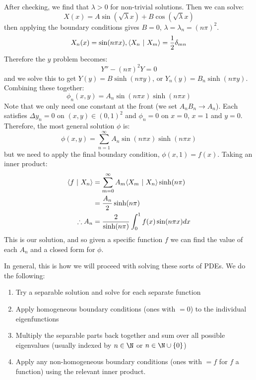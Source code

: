 \documentclass[../Main.tex]{subfiles}
\begin{document}
After checking, we find that $\lambda > 0$ for non-trivial solutions. Then we can solve:
\begin{equation*}
    X(x) = A\sin(\sqrt{\lambda}x) + B\cos(\sqrt{\lambda}x)
\end{equation*}
then applying the boundary conditions gives $B = 0$, $\lambda = \lambda_n = (n\pi)^2$.
\begin{equation*}
    X_n(x) = \sin(n\pi x), \langle X_n~\vert~X_m\rangle = \frac12 \delta_{mn}
\end{equation*}
Therefore the $y$ problem becomes:
\begin{equation*}
    Y'' - (n\pi)^2 Y = 0
\end{equation*}
and we solve this to get $Y(y) = B \sinh(n\pi y)$, or $Y_n(y) = B_n \sinh(n\pi y)$. Combining these together:
\begin{equation*}
    \phi_n(x, y) = A_n \sin(n\pi x) \sinh(n\pi x)
\end{equation*}
Note that we only need one constant at the front (we set $A_n B_n \to A_n$).
Each satisfies $\Delta y_n = 0$ on $(x, y) \in (0,1)^2$ and $\phi_n = 0$ on $x = 0$, $x = 1$ and $y = 0$. Therefore, the most general solution $\phi$ is:
\begin{equation*}
    \phi(x, y) = \sum_{n = 1}^\infty A_n \sin(n\pi x) \sinh(n\pi x)
\end{equation*}
but we need to apply the final boundary condition, $\phi(x, 1) = f(x)$. Taking an inner product:
\begin{align*}
    \langle f~\vert~X_n\rangle &= \sum_{m=0}^{\infty} A_m \langle X_m~\vert~X_n\rangle \sinh(n\pi) \\
    &= \frac{A_n}{2}\sinh(n\pi) \\
    \therefore A_n &= \frac{2}{\sinh(n\pi)} \int_{0}^{1} f(x) \sin(n\pi x) dx 
\end{align*}
This is our solution, and so given a specific function $f$ we can find the value of each $A_n$ and a closed form for $\phi$.

In general, this is how we will proceed with solving these sorts of PDEs. We do the following:
\begin{enumerate}
    \item Try a separable solution and solve for each separate function
    \item Apply homogeneous boundary conditions (ones with $=0$) to the individual eigenfunctions
    \item Multiply the separable parts back together and sum over all possible eigenvalues (usually indexed by $n \in \N$ or $n \in \N \cup \{0\}$)
    \item Apply any non-homogeneous boundary conditions (ones with $=f$ for $f$ a function) using the relevant inner product.
\end{enumerate}
\end{document}
